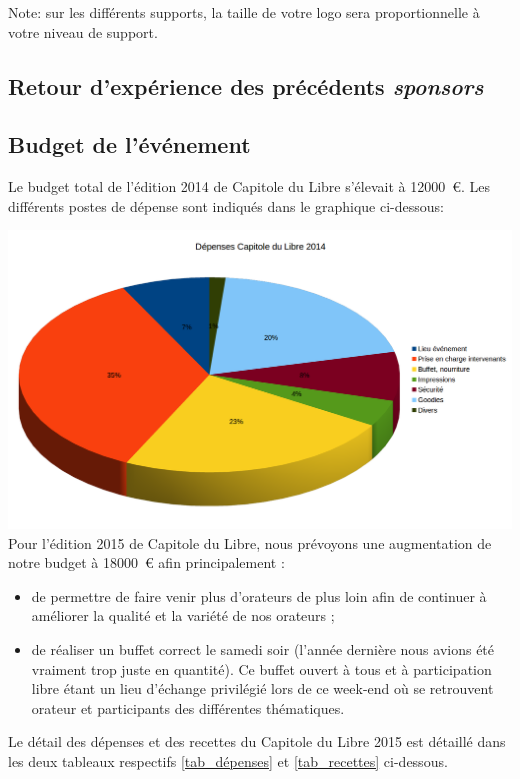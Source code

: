 Note: sur les différents supports, la taille de votre logo sera proportionnelle à votre niveau de support.

	\subsection{Retour d’expérience des précédents \textit{sponsors}}
	\subsection{Budget de l’événement}

Le budget total de l'édition 2014 de Capitole du Libre s'élevait à \SI{12000}{\euro}. Les différents postes de dépense sont indiqués dans le graphique ci-dessous:

\includegraphics[scale=0.6]{Images/budget_2014.png}\\

Pour l'édition 2015 de Capitole du Libre, nous prévoyons une augmentation de notre budget à \SI{18000}{\euro} afin principalement :
\begin{itemize}[label=$\bullet$]
\item de permettre de faire venir plus d'orateurs de plus loin afin de continuer à améliorer la qualité et la variété de nos orateurs ;
\item de réaliser un buffet correct le samedi soir (l'année dernière nous avions été vraiment trop juste en quantité). Ce buffet ouvert à tous et à participation libre étant un lieu d'échange privilégié lors de ce week-end où se retrouvent orateur et participants des différentes thématiques.
\end{itemize}

Le détail des dépenses et des recettes du Capitole du Libre 2015 est détaillé dans les deux tableaux respectifs \ref{tab_dépenses} et \ref{tab_recettes} ci-dessous.

